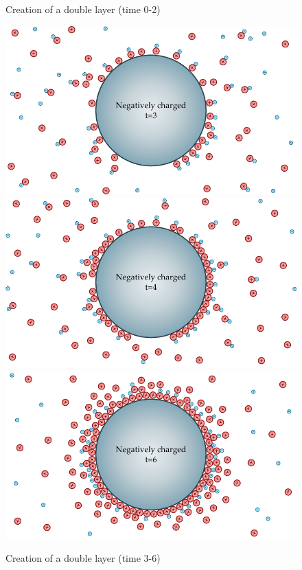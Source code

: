 \begin{figure}
\begin{center}
       \end{center}
       \caption{Creation of a double layer (time 0-2)}
       \label{fig:doubleLayer_set1}
   \end{figure}

   \begin{figure}
       \begin{center}
           \includegraphics{content/introduction/graphics/doubleLayer_t3.pdf}
           \includegraphics{content/introduction/graphics/doubleLayer_t4.pdf}
           \includegraphics{content/introduction/graphics/doubleLayer_t6.pdf}
       \end{center}
       \caption{Creation of a double layer (time 3-6)}
       \label{fig:doubleLayer_set2}
   \end{figure}

